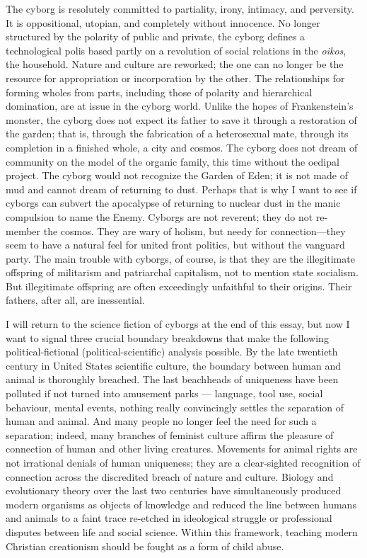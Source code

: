 \documentclass[DIV=12,%
               BCOR=10mm,%
               headinclude=false,%
               footinclude=false,open=any,%
               fontsize=11pt,%
               twoside,%
               paper=210mm:11in]%
               {scrbook}
\begin{document}
The cyborg is resolutely committed to partiality, irony, intimacy, and perversity. It is oppositional, utopian, and completely without innocence. No longer structured by the polarity of public and private, the cyborg defines a technological polis based partly on a revolution of social relations in the \emph{oikos}, the household. Nature and culture are reworked; the one can no longer be the resource for appropriation or incorporation by the other. The relationships for forming wholes from parts, including those of polarity and hierarchical domination, are at issue in the cyborg world. Unlike the hopes of Frankenstein’s monster, the cyborg does not expect its father to save it through a restoration of the garden; that is, through the fabrication of a heterosexual mate, through its completion in a finished whole, a city and cosmos. The cyborg does not dream of community on the model of the organic family, this time without the oedipal project. The cyborg would not recognize the Garden of Eden; it is not made of mud and cannot dream of returning to dust. Perhaps that is why I want to see if cyborgs can subvert the apocalypse of returning to nuclear dust in the manic compulsion to name the Enemy. Cyborgs are not reverent; they do not re-member the cosmos. They are wary of holism, but needy for connection—they seem to have a natural feel for united front politics, but without the vanguard party. The main trouble with cyborgs, of course, is that they are the illegitimate offspring of militarism and patriarchal capitalism, not to mention state socialism. But illegitimate offspring are often exceedingly unfaithful to their origins. Their fathers, after all, are inessential.


I will return to the science fiction of cyborgs at the end of this essay, but now I want to signal three crucial boundary breakdowns that make the following political-fictional (political-scientific) analysis possible. By the late twentieth century in United States scientific culture, the boundary between human and animal is thoroughly breached. The last beachheads of uniqueness have been polluted if not turned into amusement parks — language, tool use, social behaviour, mental events, nothing really convincingly settles the separation of human and animal. And many people no longer feel the need for such a separation; indeed, many branches of feminist culture affirm the pleasure of connection of human and other living creatures. Movements for animal rights are not irrational denials of human uniqueness; they are a clear-sighted recognition of connection across the discredited breach of nature and culture. Biology and evolutionary theory over the last two centuries have simultaneously produced modern organisms as objects of knowledge and reduced the line between humans and animals to a faint trace re-etched in ideological struggle or professional disputes between life and social science. Within this framework, teaching modern Christian creationism should be fought as a form of child abuse.
\end{document}
